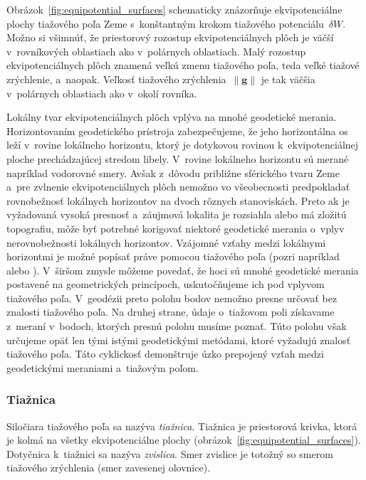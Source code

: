 \documentclass[a4paper, 12pt]{book}
\let\vec\mathbf
\begin{document}
Obrázok~\ref{fig:equipotential_surfaces} schematicky znázorňuje ekvipotenciálne 
plochy tiažového poľa Zeme s~konštantným krokom tiažového potenciálu~$\delta 
W$.  Možno si všimnúť, že priestorový rozostup ekvipotenciálnych plôch je väčší 
v~rovníkových oblastiach ako v~polárnych oblastiach.  Malý rozostup 
ekvipotenciálnych plôch znamená veľkú zmenu tiažového poľa, teda veľké tiažové 
zrýchlenie, a~naopak.  Veľkosť tiažového zrýchlenia~$\| \vec g \|$ je tak 
väčšia v~polárnych oblastiach ako v~okolí rovníka.

Lokálny tvar ekvipotenciálnych plôch vplýva na mnohé geodetické merania.  
Horizontovaním geodetického prístroja zabezpečujeme, že jeho horizontálna os 
leží v~rovine lokálneho horizontu, ktorý je dotykovou rovinou 
k~ekvipotenciálnej ploche prechádzajúcej stredom libely.  V~rovine lokálneho 
horizontu sú merané napríklad vodorovné smery.  Avšak z~dôvodu približne 
sférického tvaru Zeme a~pre zvlnenie ekvipotenciálnych plôch nemožno vo 
všeobecnosti predpokladať rovnobežnosť lokálnych horizontov na dvoch rôznych 
stanoviskách.  Preto ak je vyžadovaná vysoká presnosť a~záujmová lokalita je 
rozsiahla alebo má zložitú topografiu, môže byť potrebné korigovať niektoré 
geodetické merania o~vplyv nerovnobežnosti lokálnych horizontov.  Vzájomné 
vzťahy medzi lokálnymi horizontmi je možné popísať práve pomocou tiažového poľa 
(pozri napríklad \cite{VanicekGeodesy} alebo \cite{MoritzPhysicalGeodesy}).  
V~širšom zmysle môžeme povedať, že hoci sú mnohé geodetické merania postavené 
na geometrických princípoch, uskutočňujeme ich pod vplyvom tiažového poľa.  
V~geodézii preto polohu bodov nemožno presne určovať bez znalosti tiažového 
poľa.  Na druhej strane, údaje o~tiažovom poli získavame z~meraní v~bodoch, 
ktorých presnú polohu musíme poznať.  Túto polohu však určujeme opäť len tými 
istými geodetickými metódami, ktoré vyžadujú znalosť tiažového poľa.  Táto 
cyklickosť demonštruje úzko prepojený vzťah medzi geodetickými meraniami 
a~tiažovým poľom.

\subsubsection{Tiažnica}
\label{sec:plumbline}

Siločiara tiažového poľa sa nazýva \emph{tiažnica}.  Tiažnica je priestorová 
krivka, ktorá je kolmá na všetky ekvipotenciálne plochy 
(obrázok~\ref{fig:equipotential_surfaces}).  Dotyčnica k~tiažnici sa nazýva 
\emph{zvislica}.  Smer zvislice je totožný so smerom tiažového zrýchlenia (smer 
zavesenej olovnice).
\end{document}
